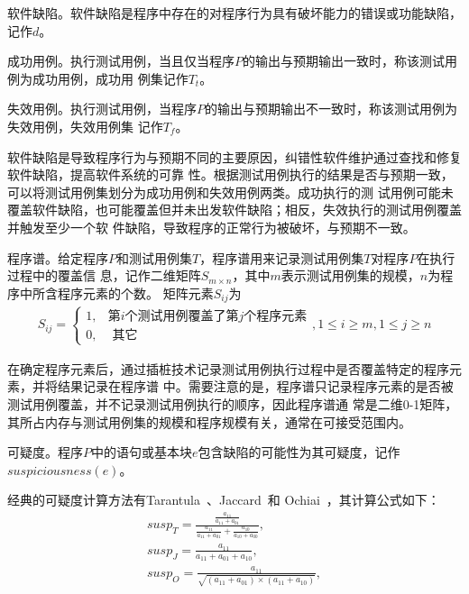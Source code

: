 \begin{Definition}
      软件缺陷。软件缺陷是程序中存在的对程序行为具有破坏能力的错误或功能缺陷，记作$d$。
\end{Definition}

\begin{Definition}
      成功用例。执行测试用例，当且仅当程序$P$的输出与预期输出一致时，称该测试用例为成功用例，成功用
      例集记作$T_t$。
\end{Definition}

\begin{Definition}
      失效用例。执行测试用例，当程序$P$的输出与预期输出不一致时，称该测试用例为失效用例，失效用例集
      记作$T_f$。
\end{Definition}

软件缺陷是导致程序行为与预期不同的主要原因，纠错性软件维护通过查找和修复软件缺陷，提高软件系统的可靠
性。根据测试用例执行的结果是否与预期一致，可以将测试用例集划分为成功用例和失效用例两类。成功执行的测
试用例可能未覆盖软件缺陷，也可能覆盖但并未出发软件缺陷；相反，失效执行的测试用例覆盖并触发至少一个软
件缺陷，导致程序的正常行为被破坏，与预期不一致。

\begin{Definition}
      程序谱。给定程序$P$和测试用例集$T$，程序谱用来记录测试用例集$T$对程序$P$在执行过程中的覆盖信
      息，记作二维矩阵$S_{m\times n}$，其中$m$表示测试用例集的规模，$n$为程序中所含程序元素的个数。
      矩阵元素$S_{ij}$为
      \begin{eqnarray}
         S_{ij} = \begin{cases} 1, & \mbox{第}i\mbox{个测试用例覆盖了第}j\mbox{个程序元素} \\ 
  0, & \text{ 其它 }  
  \end{cases}   , 1 \leqslant i \geqslant  m, 1 \leqslant j \geqslant n
      \end{eqnarray}
\end{Definition}

在确定程序元素后，通过插桩技术记录测试用例执行过程中是否覆盖特定的程序元素，并将结果记录在程序谱
中。需要注意的是，程序谱只记录程序元素的是否被测试用例覆盖，并不记录测试用例执行的顺序，因此程序谱通
常是二维0-1矩阵，其所占内存与测试用例集的规模和程序规模有关，通常在可接受范围内。

\begin{Definition}
     可疑度。程序$P$中的语句或基本块$e$包含缺陷的可能性为其可疑度，记作$suspiciousness(e)$。
\end{Definition}

经典的可疑度计算方法有Tarantula~\cite{jones2005empirical}、Jaccard~\cite{abreu2007accuracy}和
Ochiai~\cite{abreu2007accuracy}，其计算公式如下：
\begin{eqnarray}
 susp_T = \frac{\frac{a_{11}}{a_{11}+a_{01}}}{\frac{a_{11}}{a_{11}+a_{01}}+\frac{a_{10}}{a_{10}+a_{00}}}, \label{eq:tar}\\
susp_J = \frac{a_{11}}{a_{11}+a_{01}+a_{10}}, \label{eq:jac}\\
susp_O = \frac{a_{11}}{\sqrt{(a_{11}+a_{01})\times(a_{11}+a_{10})}}, \label{eq:och}
\end{eqnarray}

